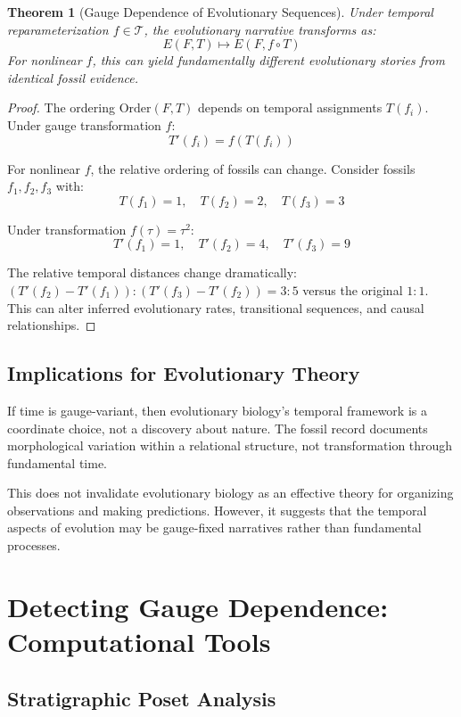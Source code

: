 \documentclass[11pt]{article}
\theoremstyle{definition}
\theoremstyle{plain}
\newtheorem{theorem}[definition]{Theorem}
\theoremstyle{remark}
\newcommand{\T}{\mathcal{T}}
\begin{document}
\begin{theorem}[Gauge Dependence of Evolutionary Sequences]
Under temporal reparameterization $f \in \T$, the evolutionary narrative transforms as:
$$E(F,T) \mapsto E(F, f \circ T)$$
For nonlinear $f$, this can yield fundamentally different evolutionary stories from identical fossil evidence.
\end{theorem}

\begin{proof}
The ordering $\text{Order}(F,T)$ depends on temporal assignments $T(f_i)$. Under gauge transformation $f$:
$$T'(f_i) = f(T(f_i))$$

For nonlinear $f$, the relative ordering of fossils can change. Consider fossils $f_1, f_2, f_3$ with:
$$T(f_1) = 1, \quad T(f_2) = 2, \quad T(f_3) = 3$$

Under transformation $f(\tau) = \tau^2$:
$$T'(f_1) = 1, \quad T'(f_2) = 4, \quad T'(f_3) = 9$$

The relative temporal distances change dramatically: $(T'(f_2) - T'(f_1)) : (T'(f_3) - T'(f_2)) = 3:5$ versus the original $1:1$. This can alter inferred evolutionary rates, transitional sequences, and causal relationships.
\end{proof}

\subsection{Implications for Evolutionary Theory}

\begin{keypoint}
If time is gauge-variant, then evolutionary biology's temporal framework is a coordinate choice, not a discovery about nature. The fossil record documents morphological variation within a relational structure, not transformation through fundamental time.
\end{keypoint}

This does not invalidate evolutionary biology as an effective theory for organizing observations and making predictions. However, it suggests that the temporal aspects of evolution may be gauge-fixed narratives rather than fundamental processes.

\section{Detecting Gauge Dependence: Computational Tools}

\subsection{Stratigraphic Poset Analysis}
\end{document}

